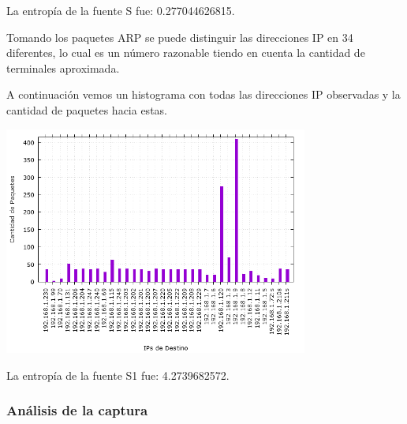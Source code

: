 La entrop\'ia de la fuente S fue: 0.277044626815.\newline

Tomando los paquetes ARP se puede distinguir las direcciones IP en 34 diferentes, lo cual es un número razonable tiendo en cuenta la cantidad de terminales aproximada.

A continuación vemos un histograma con todas las direcciones IP observadas y la cantidad de paquetes hacia estas.

\begin{center}
\includegraphics[width=0.75\textwidth]{exp2-graficos/grafico2exp2.png}
\end{center}

La entrop\'ia de la fuente S1 fue: 4.2739682572.


\subsubsection{An\'alisis de la captura}
